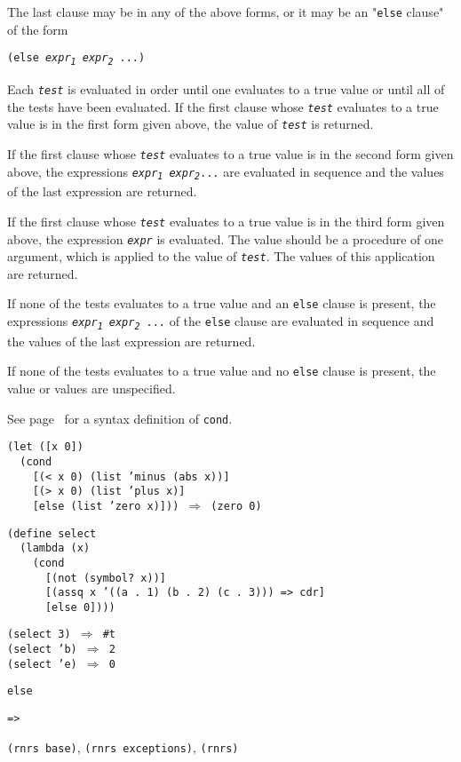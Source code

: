 The last clause may be in any of the above forms, or it may be
an "\label{control_s15}\texttt{else} clause" of the form


\texttt{(else \textit{expr\textsubscript{1}} \textit{expr\textsubscript{2}} ...)}

Each \texttt{\textit{test}} is evaluated in order until one evaluates to a true
value or until all of the tests have been evaluated.
If the first clause whose \texttt{\textit{test}} evaluates to a true value is
in the first form given above, the
value of \texttt{\textit{test}} is returned.


If the first clause whose \texttt{\textit{test}} evaluates to a true value is
in the second form given above, the
expressions \texttt{\textit{expr\textsubscript{1}} \textit{expr\textsubscript{2}}...} are evaluated in
sequence and the values of the last expression are returned.


If the first clause whose \texttt{\textit{test}} evaluates to a true value is
in the third form given above, the expression \texttt{\textit{expr}} is
evaluated.
The value should be a procedure of one argument, which is applied
to the value of \texttt{\textit{test}}.
The values of this application are returned.


If none of the tests evaluates to a true value and an \texttt{else} clause
is present, the expressions \texttt{\textit{expr\textsubscript{1}} \textit{expr\textsubscript{2}} ...} of the \texttt{else}
clause are evaluated in sequence and the values of the last expression
are returned.


If none of the tests evaluates to a true value and no \texttt{else} clause
is present, the value or values are unspecified.


See page \pageref{syntax_defn_cond} for a syntax definition of \texttt{cond}.


\begin{alltt}
(let ([x 0])
  (cond
    [(\textless{} x 0) (list 'minus (abs x))]
    [(\textgreater{} x 0) (list 'plus x)]
    [else (list 'zero x)])) \(\Rightarrow\) (zero 0)

(define select
  (lambda (x)
    (cond
      [(not (symbol? x))]
      [(assq x '((a . 1) (b . 2) (c . 3))) =\textgreater{} cdr]
      [else 0])))

(select 3) \(\Rightarrow\) \#{}t
(select 'b) \(\Rightarrow\) 2
(select 'e) \(\Rightarrow\) 0
\end{alltt}

\begin{description}

\label{control_s16}\item[syntax] \texttt{else}



\item[syntax] \texttt{=\textgreater{}}



\item[libraries] \texttt{(rnrs base)}, \texttt{(rnrs exceptions)}, \texttt{(rnrs)}
\end{description}


